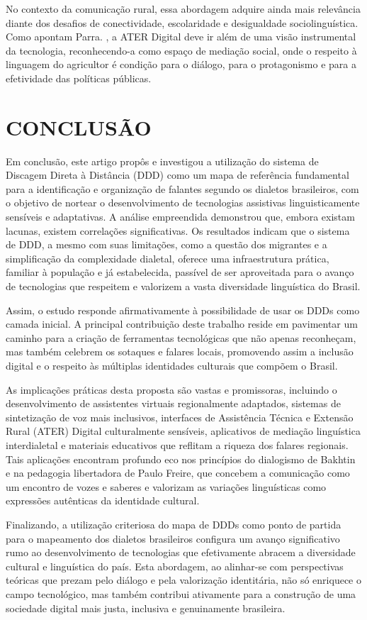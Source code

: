 No contexto da comunicação rural, essa abordagem adquire ainda mais relevância diante dos desafios de conectividade, escolaridade e desigualdade sociolinguística. Como apontam Parra. \cite{parra2022ater}, a ATER Digital deve ir além de uma visão instrumental da tecnologia, reconhecendo-a como espaço de mediação social, onde o respeito à linguagem do agricultor é condição para o diálogo, para o protagonismo e para a efetividade das políticas públicas.







\chapter{CONCLUSÃO}
Em conclusão, este artigo propôs e investigou a utilização do sistema de Discagem Direta à Distância (DDD) como um mapa de referência fundamental para a identificação e organização de falantes segundo os dialetos brasileiros, com o objetivo de nortear o desenvolvimento de tecnologias assistivas linguisticamente sensíveis e adaptativas. A análise empreendida demonstrou que, embora existam lacunas, existem correlações significativas. Os resultados indicam que o sistema de DDD, a mesmo com suas limitações, como a questão dos migrantes e a simplificação da complexidade dialetal, oferece uma infraestrutura prática, familiar à população e já estabelecida, passível de ser aproveitada para o avanço de tecnologias que respeitem e valorizem a vasta diversidade linguística do Brasil.



Assim, o estudo responde afirmativamente à possibilidade de usar os DDDs como camada inicial. A principal contribuição deste trabalho reside em pavimentar um caminho para a criação de ferramentas tecnológicas que não apenas reconheçam, mas também celebrem os sotaques e falares locais, promovendo assim a inclusão digital e o respeito às múltiplas identidades culturais que compõem o Brasil.


As implicações práticas desta proposta são vastas e promissoras, incluindo o desenvolvimento de assistentes virtuais regionalmente adaptados, sistemas de sintetização de voz mais inclusivos, interfaces de Assistência Técnica e Extensão Rural (ATER) Digital culturalmente sensíveis, aplicativos de mediação linguística interdialetal  e materiais educativos que reflitam a riqueza dos falares regionais. Tais aplicações encontram profundo eco nos princípios do dialogismo de Bakhtin e na pedagogia libertadora de Paulo Freire, que concebem a comunicação como um encontro de vozes e saberes e valorizam as variações linguísticas como expressões autênticas da identidade cultural. 


Finalizando, a utilização criteriosa do mapa de DDDs como ponto de partida para o mapeamento dos dialetos brasileiros configura um avanço significativo rumo ao desenvolvimento de tecnologias que efetivamente abracem a diversidade cultural e linguística do país. Esta abordagem, ao alinhar-se com perspectivas teóricas que prezam pelo diálogo e pela valorização identitária, não só enriquece o campo tecnológico, mas também contribui ativamente para a construção de uma sociedade digital mais justa, inclusiva e genuinamente brasileira.